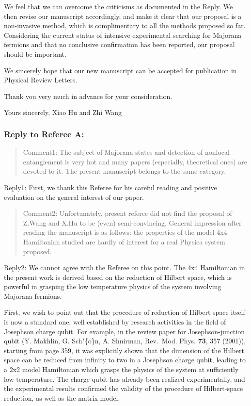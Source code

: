 \documentclass[11pt]{article}
\begin{document}
We feel that we can overcome the criticisms as documented in the Reply.
We then revise our manuscript accordingly, and make it clear that our
proposal is a non-invasive method, which is complimentary to all the
methods proposed so far. Considering the current status of intensive
experimental searching for Majorana fermions and that no conclusive
confirmation has been reported, our proposal should be important.

We sincerely hope that our new manuscript can be accepted for
publication in Physical Review Letters.

Thank you very much in advance for your consideration.

Yours sincerely, Xiao Hu and Zhi Wang

\hypertarget{reply-to-referee-a}{%
\subsubsection{Reply to Referee A:}\label{reply-to-referee-a}}

\begin{quote}
Comment1: The subject of Majorana states and detection of nonlocal
entanglement is very hot and many papers (especially, theoretical ones)
are devoted to it. The present manuscript belongs to the same category.
\end{quote}

Reply1: First, we thank this Referee for his careful reading and
positive evaluation on the general interest of our paper.

\begin{quote}
Comment2: Unfortunately, present referee did not find the proposal of
Z.Wang and X.Hu to be (even) semi-convincing. General impression after
reading the manuscript is as follows: the properties of the model 4x4
Hamiltonian studied are hardly of interest for a real Physica system
proposed.
\end{quote}

Reply2: We cannot agree with the Referee on this point. The 4x4
Hamiltonian in the present work is derived based on the reduction of
Hilbert space, which is powerful in grasping the low temperature physics
of the system involving Majorana fermions.

First, we wish to point out that the procedure of reduction of Hilbert
space itself is now a standard one, well established by research
activities in the field of Josephson charge qubit. For example, in the
review paper for Josephson-junction qubit (Y. Makhlin, G. Sch"\{o\}n, A.
Shnirman, Rev.~Mod. Phys. \textbf{73}, 357 (2001)), starting from page
359, it was explicitly shown that the dimension of the Hilbert space can
be reduced from infinity to two in a Josephson charge qubit, leading to
a 2x2 model Hamiltonian which grasps the physics of the system at
sufficiently low temperature. The charge qubit has already been realized
experimentally, and the experimental results confirmed the validity of
the procedure of Hilbert-space reduction, as well as the matrix model.
\end{document}
